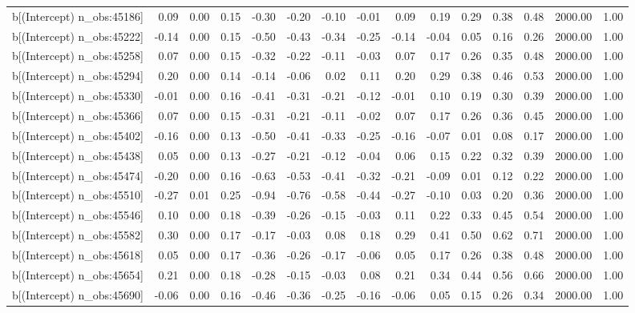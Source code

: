 \begin{table}[ht]
\begin{tabular}{rrrrrrrrrrrrrrr}
  b[(Intercept) n\_obs:45186] & 0.09 & 0.00 & 0.15 & -0.30 & -0.20 & -0.10 & -0.01 & 0.09 & 0.19 & 0.29 & 0.38 & 0.48 & 2000.00 & 1.00 \\ 
  b[(Intercept) n\_obs:45222] & -0.14 & 0.00 & 0.15 & -0.50 & -0.43 & -0.34 & -0.25 & -0.14 & -0.04 & 0.05 & 0.16 & 0.26 & 2000.00 & 1.00 \\ 
  b[(Intercept) n\_obs:45258] & 0.07 & 0.00 & 0.15 & -0.32 & -0.22 & -0.11 & -0.03 & 0.07 & 0.17 & 0.26 & 0.35 & 0.48 & 2000.00 & 1.00 \\ 
  b[(Intercept) n\_obs:45294] & 0.20 & 0.00 & 0.14 & -0.14 & -0.06 & 0.02 & 0.11 & 0.20 & 0.29 & 0.38 & 0.46 & 0.53 & 2000.00 & 1.00 \\ 
  b[(Intercept) n\_obs:45330] & -0.01 & 0.00 & 0.16 & -0.41 & -0.31 & -0.21 & -0.12 & -0.01 & 0.10 & 0.19 & 0.30 & 0.39 & 2000.00 & 1.00 \\ 
  b[(Intercept) n\_obs:45366] & 0.07 & 0.00 & 0.15 & -0.31 & -0.21 & -0.11 & -0.02 & 0.07 & 0.17 & 0.26 & 0.36 & 0.45 & 2000.00 & 1.00 \\ 
  b[(Intercept) n\_obs:45402] & -0.16 & 0.00 & 0.13 & -0.50 & -0.41 & -0.33 & -0.25 & -0.16 & -0.07 & 0.01 & 0.08 & 0.17 & 2000.00 & 1.00 \\ 
  b[(Intercept) n\_obs:45438] & 0.05 & 0.00 & 0.13 & -0.27 & -0.21 & -0.12 & -0.04 & 0.06 & 0.15 & 0.22 & 0.32 & 0.39 & 2000.00 & 1.00 \\ 
  b[(Intercept) n\_obs:45474] & -0.20 & 0.00 & 0.16 & -0.63 & -0.53 & -0.41 & -0.32 & -0.21 & -0.09 & 0.01 & 0.12 & 0.22 & 2000.00 & 1.00 \\ 
  b[(Intercept) n\_obs:45510] & -0.27 & 0.01 & 0.25 & -0.94 & -0.76 & -0.58 & -0.44 & -0.27 & -0.10 & 0.03 & 0.20 & 0.36 & 2000.00 & 1.00 \\ 
  b[(Intercept) n\_obs:45546] & 0.10 & 0.00 & 0.18 & -0.39 & -0.26 & -0.15 & -0.03 & 0.11 & 0.22 & 0.33 & 0.45 & 0.54 & 2000.00 & 1.00 \\ 
  b[(Intercept) n\_obs:45582] & 0.30 & 0.00 & 0.17 & -0.17 & -0.03 & 0.08 & 0.18 & 0.29 & 0.41 & 0.50 & 0.62 & 0.71 & 2000.00 & 1.00 \\ 
  b[(Intercept) n\_obs:45618] & 0.05 & 0.00 & 0.17 & -0.36 & -0.26 & -0.17 & -0.06 & 0.05 & 0.17 & 0.26 & 0.38 & 0.48 & 2000.00 & 1.00 \\ 
  b[(Intercept) n\_obs:45654] & 0.21 & 0.00 & 0.18 & -0.28 & -0.15 & -0.03 & 0.08 & 0.21 & 0.34 & 0.44 & 0.56 & 0.66 & 2000.00 & 1.00 \\ 
  b[(Intercept) n\_obs:45690] & -0.06 & 0.00 & 0.16 & -0.46 & -0.36 & -0.25 & -0.16 & -0.06 & 0.05 & 0.15 & 0.26 & 0.34 & 2000.00 & 1.00 \\ 

\end{tabular}
\end{table}
